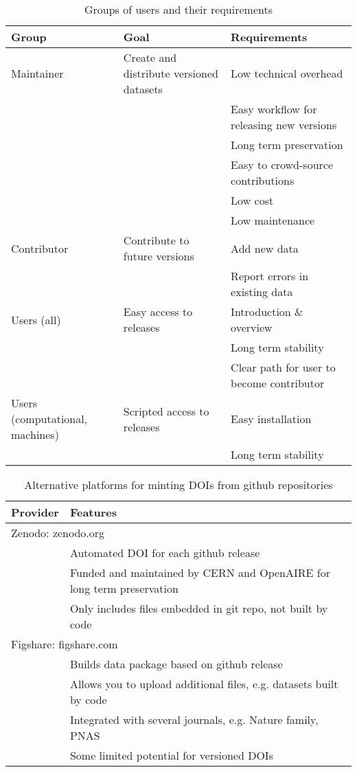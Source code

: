 \documentclass[a4paper,11pt]{article}
\begin{document}
\newpage

\begin{table}[h!]
\centering
\caption{Groups of users and their requirements}
{\footnotesize
\vspace{1cm}
  \begin{tabular}{p{2cm}p{5cm}p{7cm}}
  \hline
  \textbf{Group} & \textbf{Goal} & \textbf{Requirements} \\ \hline
  Maintainer & Create and distribute versioned datasets & Low technical overhead \\
    & & Easy workflow for releasing new versions \\
    & & Long term preservation \\
    & & Easy to crowd-source contributions \\
    & & Low cost \\
    & & Low maintenance \\
  Contributor & Contribute to future versions & Add new data \\
    & & Report errors in existing data  \\
  Users (all) & Easy access to releases & Introduction \& overview \\
    & & Long term stability \\
    & & Clear path for user to become contributor \\
  Users (computational, machines) & Scripted access to releases & Easy installation\\
    & & Long term stability \\
  \hline
  \end{tabular}
  }
\label{tab:user_requirements}
\end{table}

\newpage


\begin{table}[h!]
\centering
\caption{Alternative platforms for minting DOIs from github repositories}
{\footnotesize
\vspace{1cm}
  \begin{tabular}{p{3cm}p{8cm}}
  \hline
  \textbf{Provider} & \textbf{Features} \\ \hline
  \multicolumn{2}{l}{Zenodo: zenodo.org}\\
    & Automated DOI for each github release \\
    & Funded and maintained by CERN and OpenAIRE for long term preservation \\
    & Only includes files embedded in git repo, not built  by code\\
  \multicolumn{2}{l}{Figshare: figshare.com}\\
    & Builds data package based on github release \\
    & Allows you to upload additional files, e.g. datasets built by code \\
    & Integrated with several journals, e.g. Nature family, PNAS \\
    & Some limited potential for versioned DOIs\\
  \hline
  \end{tabular}
  }
\label{tab:doi_minting}
\end{table}

\newpage


\end{document}
